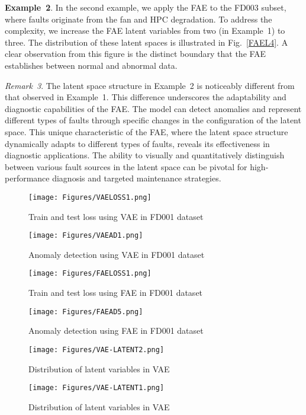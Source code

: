 \documentclass[journal]{IEEEtran}
\begin{document}
\textbf{Example~2}. In the second example, we apply the FAE to the FD003 subset, where faults originate from the fan and HPC degradation. To address the complexity, we increase the FAE latent variables from two (in Example~1) to three. The distribution of these latent spaces is illustrated in Fig.~\ref{FAEL4}. A clear observation from this figure is the distinct boundary that the FAE establishes between normal and abnormal data. 

\textit{Remark~3}. The latent space structure in Example~2 is noticeably different from that observed in Example~1. This difference underscores the adaptability and diagnostic capabilities of the FAE. The model can detect anomalies and represent different types of faults through specific changes in the configuration of the latent space. This unique characteristic of the FAE, where the latent space structure dynamically adapts to different types of faults, reveals its effectiveness in diagnostic applications. The ability to visually and quantitatively distinguish between various fault sources in the latent space can be pivotal for high-performance diagnosis and targeted maintenance strategies.
\begin{figure}
\centering
	\texttt{[image: Figures/VAELOSS1.png]}
	\caption{Train and test loss using VAE in FD001 dataset }
	\label{VAE1}
\end{figure}

\begin{figure}
\centering
	\texttt{[image: Figures/VAEAD1.png]}
	\caption{Anomaly detection using VAE in FD001 dataset }
	\label{VAE1AD}
\end{figure}
\begin{figure}
\centering
	\texttt{[image: Figures/FAELOSS1.png]}
	\caption{Train and test loss using FAE in FD001 dataset }
	\label{FAELOSS}
\end{figure}

\begin{figure}
\centering
	\texttt{[image: Figures/FAEAD5.png]}
	\caption{Anomaly detection using FAE in FD001 dataset }
	\label{FAE1AD}
\end{figure}
\begin{figure}
\centering
	\texttt{[image: Figures/VAE-LATENT2.png]}
	\caption{Distribution of latent variables in VAE}
	\label{VAEL2}
\end{figure}
\begin{figure}
\centering
	\texttt{[image: Figures/VAE-LATENT1.png]}
	\caption{Distribution of latent variables in VAE}
	\label{VAEL1}
\end{figure}
\end{document}

